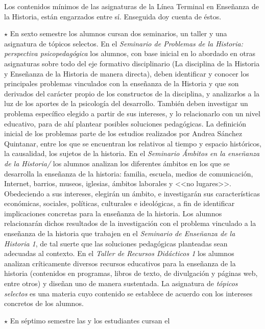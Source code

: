\enlargethispage{1\baselineskip}
Los contenidos mínimos de las asignaturas de  la  Línea Terminal en Enseñanza de la Historia, están engarzados entre sí. Enseguida doy cuenta de éstos. 
\begin{Obs} 
\item[$\star$] En sexto semestre los alumnos cursan dos 
seminarios, un taller y una asignatura de tópicos selectos. En el 
\textit{Seminario de Problemas de la Historia: perspectiva 
psicopedagógica\/} los alumnos,  con base inicial en lo abordado en 
otras asignaturas sobre todo del eje formativo disciplinario (La 
disciplina de la Historia y Enseñanza de la Historia de manera directa), 
deben identificar y conocer los principales problemas vinculados con la 
enseñanza de la Historia y que son derivados del carácter propio de los 
constructos de la disciplina, y analizarlos a la luz de los aportes de 
la psicología del desarrollo. También deben investigar un problema específico 
elegido a partir de sus intereses, y lo relacionarlo con un nivel 
educativo, para de ahí plantear posibles soluciones pedagógicas. La 
definición inicial de los problemas parte de los estudios realizados por 
Andrea Sánchez Quintanar, entre los que se encuentran los relativos 
al tiempo y espacio históricos, la causalidad, los sujetos de la historia. En el 
\textit{Seminario Ámbitos en la enseñanza de la Historia/} los alumnos 
analizan los diferentes ámbitos en los que se desarrolla la enseñanza 
de la historia: familia, escuela, medios de comunicación, Internet, 
barrios, museos, iglesias, ámbitos laborales y <<no lugares>>. 
Obedeciendo a sus intereses, elegirán un ámbito, e investigarán sus 
características económicas, sociales, políticas, culturales e 
ideológicas, a fin de identificar implicaciones concretas para la enseñanza 
de la historia. Los alumnos relacionarán dichos resultados de la
investigación con el problema vinculado a la enseñanza de la historia 
que trabajen en el {\itshape Seminario de Enseñanza de la Historia 1\/}, de tal
suerte que las soluciones pedagógicas planteadas sean adecuadas al contexto.  
En el \textit{Taller de Recursos Didácticos 1\/} los alumnos analizan 
críticamente diversos recursos educativos para la enseñanza de la 
historia (contenidos en programas, libros de texto, de divulgación y 
páginas web, entre otros) y diseñan uno de manera sustentada. La 
asignatura de \textit{tópicos selectos\/} es una materia cuyo contenido 
se establece de acuerdo con los intereses concretos de los alumnos.
\item[$\star$] En séptimo semestre las y los estudiantes cursan el 

\end{Obs}
